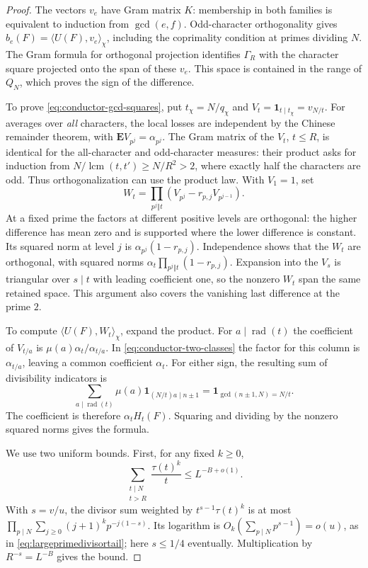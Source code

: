 \documentclass[11pt,a4paper]{article}
\numberwithin{equation}{section}
\begin{document}
\begin{proof}
The vectors $v_e$ have Gram matrix $K$: membership in both families
is equivalent to induction from $\gcd(e,f)$. Odd-character
orthogonality gives $b_e(F)=\langle U(F),v_e\rangle_\chi$,
including the coprimality condition at primes dividing $N$.
The Gram formula for orthogonal projection identifies $\Gamma_R$
with the character square projected onto the span of these $v_e$.
This space is contained in the range of $Q_N$, which proves the
sign of the difference.

To prove \eqref{eq:conductor-gcd-squares}, put $t_\chi=N/q_\chi$
and $V_t=\mathbf1_{t\mid t_\chi}=v_{N/t}$. For averages over
\emph{all} characters, the local losses are independent by the
Chinese remainder theorem, with
$\mathbf E V_{p^j}=\alpha_{p^j}$. The Gram matrix of the $V_t$,
$t\le R$, is identical for the all-character and odd-character
measures: their product asks for induction from
$N/\operatorname{lcm}(t,t')\ge N/R^2>2$, where exactly half the
characters are odd. Thus orthogonalization can use the product law.
With $V_1=1$, set
\[
 W_t=\prod_{p^j\Vert t}(V_{p^j}-r_{p,j}V_{p^{j-1}}).
\]
At a fixed prime the factors at different positive levels are
orthogonal: the higher difference has mean zero and is supported
where the lower difference is constant. Its squared norm at
level $j$ is $\alpha_{p^j}(1-r_{p,j})$. Independence shows that
the $W_t$ are orthogonal, with squared norms
$\alpha_t\prod_{p^j\Vert t}(1-r_{p,j})$. Expansion into the $V_s$
is triangular over $s\mid t$ with leading coefficient one, so
the nonzero $W_t$ span the same retained space. This argument
also covers the vanishing last difference at the prime $2$.

To compute $\langle U(F),W_t\rangle_\chi$, expand the product.
For $a\mid\operatorname{rad}(t)$ the coefficient of $V_{t/a}$
is $\mu(a)\alpha_t/\alpha_{t/a}$. In
\eqref{eq:conductor-two-classes} the factor for this column is
$\alpha_{t/a}$, leaving a common coefficient $\alpha_t$. For
either sign, the resulting sum of divisibility indicators is
\[
 \sum_{a\mid\operatorname{rad}(t)}\mu(a)
 \mathbf1_{(N/t)a\mid n\pm1}
 =\mathbf1_{\gcd(n\pm1,N)=N/t}.
\]
The coefficient is therefore $\alpha_t H_t(F)$. Squaring and
dividing by the nonzero squared norms gives the formula.

We use two uniform bounds. First, for any fixed $k\ge0$,
\begin{equation}
 \sum_{\substack{t\mid N\\ t>R}}\frac{\tau(t)^k}{t}
 \le L^{-B+o(1)} .
 \label{eq:weighted-conductor-loss}
\end{equation}
With $s=v/u$, the divisor sum weighted by $t^{s-1}\tau(t)^k$
is at most $\prod_{p\mid N}\sum_{j\ge0}(j+1)^k p^{-j(1-s)}$.
Its logarithm is $O_k(\sum_{p\mid N}p^{s-1})=o(u)$, as in
\eqref{eq:largeprimedivisortail}; here $s\le1/4$ eventually.
Multiplication by $R^{-s}=L^{-B}$ gives the bound.


\end{proof}
\end{document}

